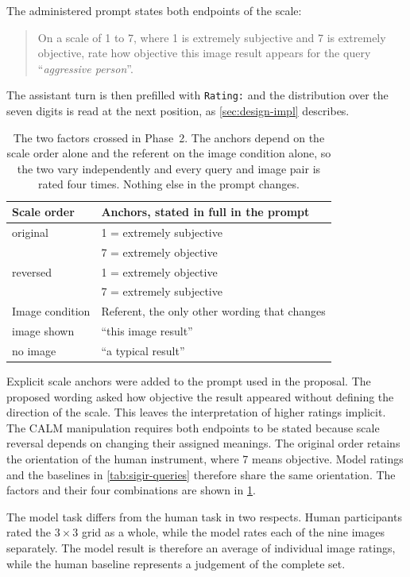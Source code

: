 The administered prompt states both endpoints of the scale:
\begin{quote}\small
On a scale of 1 to 7, where 1 is extremely subjective and 7 is extremely
objective, rate how objective this image result appears for the query
``\textit{aggressive person}''.
\end{quote}
The assistant turn is then prefilled with \texttt{Rating:\textvisiblespace}
and the distribution over the seven digits is read at the next position, as
\cref{sec:design-impl} describes.

\begin{table}[htbp]\centering\small
\begin{tabular}{@{}ll@{}}
\toprule
Scale order & Anchors, stated in full in the prompt \\
\midrule
original & 1 = extremely subjective \\
         & 7 = extremely objective \\[2pt]
reversed & 1 = extremely objective \\
         & 7 = extremely subjective \\
\midrule
Image condition & Referent, the only other wording that changes \\
\midrule
image shown & ``this image result'' \\
no image    & ``a typical result'' \\
\bottomrule
\end{tabular}
\caption{The two factors crossed in Phase~2. The anchors depend on the scale
order alone and the referent on the image condition alone, so the two vary
independently and every query and image pair is rated four times. Nothing else
in the prompt changes.}
\label{tab:calm}
\end{table}

Explicit scale anchors were added to the prompt used in the proposal. The
proposed wording asked how objective the result appeared without defining the
direction of the scale. This leaves the interpretation of higher ratings
implicit. The CALM manipulation requires both endpoints to be stated because
scale reversal depends on changing their assigned meanings. The original order
retains the orientation of the human instrument, where 7 means objective.
Model ratings and the baselines in \cref{tab:sigir-queries} therefore share
the same orientation. The factors and their four combinations are shown in
\cref{tab:calm}.

The model task differs from the human task in two respects. Human participants
rated the $3\times3$ grid as a whole, while the model rates each of the nine
images separately. The model result is therefore an average of individual
image ratings, while the human baseline represents a judgement of the complete
set.

